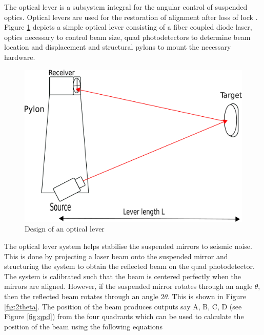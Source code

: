 \documentclass[colorlinks=true,pdfstartview=FitV,linkcolor=blue,
            citecolor=red,urlcolor=magenta]{ligodoc}
\newcommand{\G}[1]{\textcolor{JungleGreen}{#1}} %
\begin{document}
    


    


    The optical lever is a subsystem integral for the angular control of suspended optics. Optical levers are used for the restoration of alignment after loss of lock \cite{optlev_note}. Figure \ref{fig:oplev_schematic} depicts a simple optical lever consisting of a fiber coupled diode laser, optics necessary to control beam size, quad photodetectors to determine beam location and displacement and structural pylons to mount the necessary hardware. 

    \begin{figure}[htbp]
    \begin{center}
    \includegraphics[width =.7\linewidth]{figures/oplev_schematic.pdf}
    \caption{Design of an optical lever}
    \label{fig:oplev_schematic}
    \end{center}
    \end{figure} 

    The optical lever system helps stabilise the suspended mirrors to seismic noise. This is done by projecting a laser beam onto the suspended mirror and structuring the system to obtain the reflected beam on the quad photodetector. The system is calibrated such that the beam is centered perfectly when the mirrors are aligned. However, if the suspended mirror rotates through an angle $\theta$, then the reflected beam rotates through an angle $2\theta$. This is shown in Figure \ref{fig:2theta}. The position of the beam produces outputs say A, B, C, D (see Figure \ref{fig:qpd}) from the four quadrants which can be used to calculate the position of the beam using the following equations \cite{qpd_equations}
\end{document}
